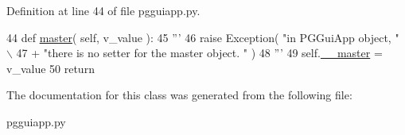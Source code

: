 Definition at line 44 of file pgguiapp.\+py.


\begin{DoxyCode}
44     \textcolor{keyword}{def }\hyperlink{classnegui_1_1pgguiapp_1_1PGGuiApp_a0af5ea1a1b6d1565002150d7b53efbdc}{master}( self, v\_value ):
45         \textcolor{stringliteral}{'''}
46 \textcolor{stringliteral}{        raise Exception( "in PGGuiApp object, " \(\backslash\)}
47 \textcolor{stringliteral}{        + "there is no setter for the master object. " )}
48 \textcolor{stringliteral}{        '''}
49         self.\hyperlink{classnegui_1_1pgguiapp_1_1PGGuiApp_a2c0bf5603d97681a9cce6b2df7cd3bd3}{\_\_master} = v\_value
50         \textcolor{keywordflow}{return}
\end{DoxyCode}


The documentation for this class was generated from the following file\+:\begin{DoxyCompactItemize}
\item 
pgguiapp.\+py\end{DoxyCompactItemize}
